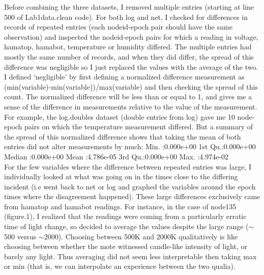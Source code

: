 \documentclass[english]{article}\usepackage[]{graphicx}\usepackage[]{color}
\begin{document}
Before combining the three datasets, I removed multiple entries (starting at line 500 of Lab1data.clean code).  For both log and net, I checked for differences in records of repeated entries (each nodeid-epoch pair should have the same observation) and inspected the nodeid-epoch pairs for which a reading in voltage, hamatop, hamabot, temperature or humidity differed.  The multiple entries had mostly the same number of records, and when they did differ, the spread of this difference was negligible so I just replaced the values with the average of the two. I defined `negligible' by first defining a normalized difference measurement as (min(variable)-min(variable))/max(variable) and then checking the spread of this count.  The normalized difference will be less than or equal to 1, and gives me a sense of the difference in measurements relative to the value of the measurement. For example, the log.doubles dataset (double entries from log) gave me 10 node-epoch pairs on which the temperature measurement differed.  But a summary of the spread of this normalized difference shows that taking the mean of both entries did not alter measurements by much:
Min.   :0.000e+00        
1st Qu.:0.000e+00        
Median :0.000e+00        
Mean   :4.786e-05        
3rd Qu.:0.000e+00        
Max.   :4.974e-02   
\\
For the few variables where the difference between repeated entries was large, I individually looked at what was going on in the times close to the differing incident (i.e went back to net or log and graphed the variables around the epoch times where the disagreement happened).  These large differences exclusively came from hamatop and hamabot readings. For instance, in the case of node135 (figure.1), I realized that the readings were coming from a particularly erratic time of light change, so decided to average the values despite the large range ($\sim$500 versus $\sim$2000). Choosing between 500K and 2000K qualitatively is like choosing between whether the mote witnessed candle-like intensity of light, or barely any light. Thus averaging did not seem less interpretable then taking max or min (that is, we can interpolate an experience between the two qualia).
\end{document}
